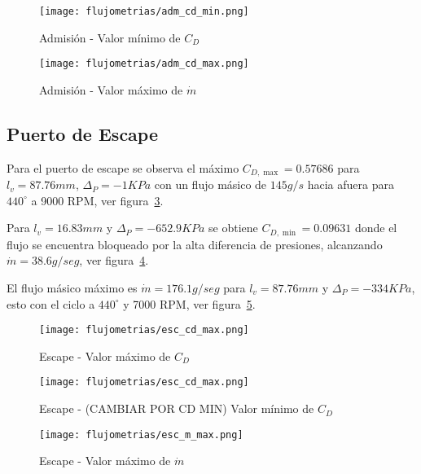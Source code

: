 \begin{figure}[ht!]
    \centering
    \texttt{[image: flujometrias/adm\_cd\_min.png]}
    \caption{Admisión - Valor mínimo de $C_{D}$}\label{fig:adm_cd_min}
\end{figure}

\begin{figure}[ht!]
    \centering
    \texttt{[image: flujometrias/adm\_cd\_max.png]}
    \caption{Admisión - Valor máximo de $\dot{m}$}\label{fig:adm_m_max}
\end{figure}

\subsection{Puerto de Escape}

Para el puerto de escape se observa el máximo $C_{D,\max}=0.57686$ para
$l_{v}=87.76 mm$, $\Delta_{P}=-1 KPa$ con un flujo másico de $145 g/s$ hacia
afuera para $440^{\circ}$ a 9000 RPM, ver figura~\ref{fig:esc_cd_max}.


Para $l_{v}=16.83 mm$ y $\Delta_{P}=-652.9 KPa$ se obtiene $C_{D, \min}=0.09631$
donde el flujo se encuentra bloqueado por la alta diferencia de presiones,
alcanzando $\dot{m}=38.6 g/seg$, ver figura~\ref{fig:esc_cd_min}.


El flujo másico máximo es $\dot{m}=176.1 g/seg$ para $l_{v}=87.76 mm$ y
$\Delta_{P}=-334 KPa$, esto con el ciclo a $440^{\circ}$ y 7000 RPM,
ver figura~\ref{fig:esc_m_max}.

\begin{figure}[ht]
    \centering
    \texttt{[image: flujometrias/esc\_cd\_max.png]}
    \caption{Escape - Valor máximo de $C_{D}$}\label{fig:esc_cd_max}
\end{figure}

\begin{figure}[ht]
    \centering
    \texttt{[image: flujometrias/esc\_cd\_max.png]}
    \caption{Escape - (CAMBIAR POR CD MIN) Valor mínimo de $C_{D}$}\label{fig:esc_cd_min}
\end{figure}

\begin{figure}[ht]
    \centering
    \texttt{[image: flujometrias/esc\_m\_max.png]}
    \caption{Escape - Valor máximo de $\dot{m}$}\label{fig:esc_m_max}
\end{figure}



